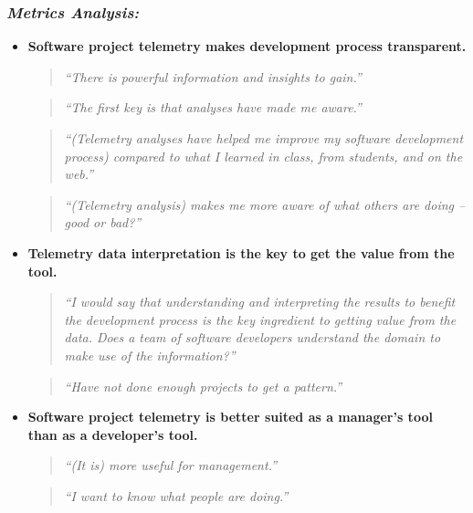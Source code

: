 \subsubsection{\textit{Metrics Analysis:}}
\begin{itemize}
  \item \textbf{Software project telemetry makes development process transparent.}
    \begin{quote} \textit{``There is powerful information and insights 
           to gain.''} \end{quote} 
    \begin{quote} \textit{``The first key is that analyses have made 
           me aware.''} \end{quote}
    \begin{quote} \textit{``(Telemetry analyses have helped me improve 
           my software development process) compared to what I learned 
           in class, from students, and on the web.''} \end{quote}
    \begin{quote} \textit{``(Telemetry analysis) makes me more aware of 
           what others are doing -- good or bad?''} \end{quote}
    

  \item \textbf{Telemetry data interpretation is the key to get the value from the tool.}
    \begin{quote} \textit{``I would say that understanding and interpreting 
           the results to benefit the development process is the key ingredient 
           to getting value from the data. Does a team of software developers 
           understand the domain to make use of the information?''} \end{quote}
    \begin{quote} \textit{``Have not done enough projects to get a
           pattern.''} \end{quote}
 
  \item \textbf{Software project telemetry is better suited as a manager's tool than as a developer's tool.} 
    \begin{quote} \textit{``(It is) more useful for management.''} \end{quote}  
    \begin{quote} \textit{``I want to know what people are doing.''} \end{quote}
    

\end{itemize}

